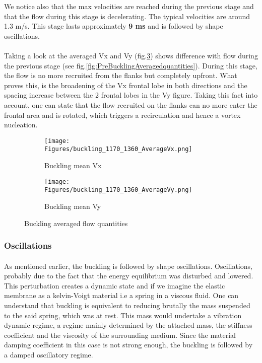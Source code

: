 \documentclass[a4paper,10pt]{report}
\begin{document}
We notice also that the max velocities are reached during the previous stage and that the flow during this stage is decelerating. The typical velocities are around 1.3 m/s. This stage lasts approximately \textbf{9 ms}  and is followed by shape oscillations.
\paragraph{}
Taking a look at the averaged Vx and Vy (fig.\ref{fig:BucklingAveragedquantities}) shows difference with flow during the previous stage (see fig.\ref{fig:PreBucklingAveragedquantities}). During this stage, the flow is no more recruited from the flanks but completely upfront. What proves this, is the broadening of the Vx frontal lobe in both directions and the spacing increase between the 2 frontal lobes in the Vy figure. Taking this fact into account, one can state that the flow recruited on the flanks can no more enter the frontal area and is rotated, which triggers a recirculation and hence a vortex nucleation.
\begin{figure}[htbp]%
	\centering%
	 \begin{subfigure}[t]{0.5\textwidth}%
        \texttt{[image: Figures/buckling\_1170\_1360\_AverageVx.png]}%
        \caption{Buckling mean Vx}%
				\label{fig:BucklingVx}%
    \end{subfigure}%
    \begin{subfigure}[t]{0.5\textwidth}%
        \texttt{[image: Figures/buckling\_1170\_1360\_AverageVy.png]}%
        \caption{Buckling mean Vy}%
        \label{fig:BucklingVy}%
    \end{subfigure}%
		\caption{Buckling averaged flow quantities}%
		\label{fig:BucklingAveragedquantities}%
\end{figure}


\subsubsection{Oscillations}
\paragraph{}
As mentioned earlier, the buckling is followed by shape oscillations. Oscillations, probably due to the fact that the energy equilibrium was disturbed and lowered. This perturbation creates a dynamic state and if we imagine the elastic membrane as a kelvin-Voigt material i.e a spring in a viscous fluid. One can understand that buckling is equivalent to reducing brutally the mass suspended to the said spring, which was at rest. This mass would undertake a vibration dynamic regime, a regime mainly determined by the attached mass, the stiffness coefficient and the viscosity of the surrounding medium. Since the material damping coefficient in this case is not strong enough, the buckling is followed by a damped oscillatory regime.
\end{document}
